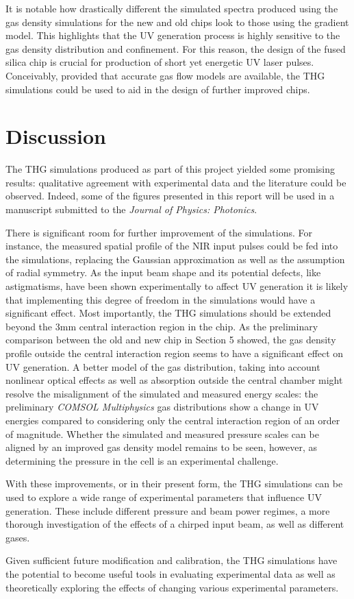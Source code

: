 \documentclass[a4paper]{jpconf}
\begin{document}
It is notable how drastically different the simulated spectra produced using the gas density simulations for the new and old chips look to those using the gradient model. This highlights that the UV generation process is highly sensitive to the gas density distribution and confinement. For this reason, the design of the fused silica chip is crucial for production of short yet energetic UV laser pulses. Conceivably, provided that accurate gas flow models are available, the THG simulations could be used to aid in the design of further improved chips. 

\section{Discussion}

The THG simulations produced as part of this project yielded some promising results: qualitative agreement with experimental data and the literature could be observed. Indeed, some of the figures presented in this report will be used in a manuscript submitted to the \textit{Journal of Physics: Photonics}. \par 
There is significant room for further improvement of the simulations. For instance, the measured spatial profile of the NIR input pulses could be fed into the simulations, replacing the Gaussian approximation as well as the assumption of radial symmetry. As the input beam shape and its potential defects, like astigmatisms, have been shown experimentally to affect UV generation it is likely that implementing this degree of freedom in the simulations would have a significant effect. Most importantly, the THG simulations should be extended beyond the 3mm central interaction region in the chip. As the preliminary comparison between the old and new chip in Section 5 showed, the gas density profile outside the central interaction region seems to have a significant effect on UV generation.  A better model of the gas distribution, taking into account nonlinear optical effects as well as absorption outside the central chamber might resolve the misalignment of the simulated and measured energy scales: the preliminary \textit{COMSOL Multiphysics} gas distributions show a change in UV energies compared to considering only the central interaction region of an order of magnitude. Whether the simulated and measured pressure scales can be aligned by an improved gas density model remains to be seen, however, as determining the pressure in the cell is an experimental challenge. \par 
With these improvements, or in their present form, the THG simulations can be used to explore a wide range of experimental parameters that influence UV generation. These include different pressure and beam power regimes, a more thorough investigation of the effects of a chirped input beam, as well as different gases. \par 
Given sufficient future modification and calibration, the THG simulations have the potential to become useful tools in evaluating experimental data as well as theoretically exploring the effects of changing various experimental parameters.  
\end{document}
